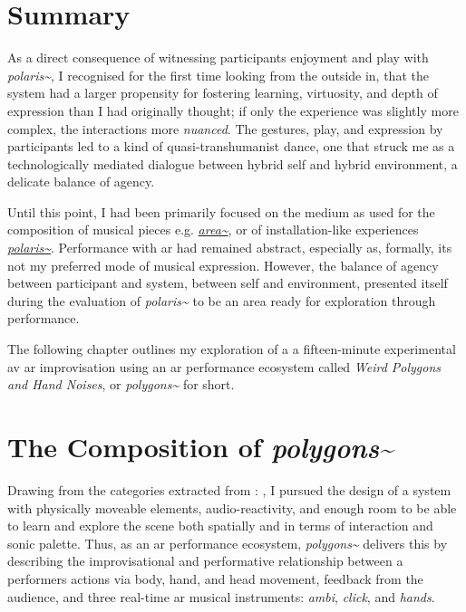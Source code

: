 \clearpage
\section{Summary}\label{sec: polygons-developing}
As a direct consequence of witnessing participants enjoyment and play with \textit{polaris\textasciitilde{}}, I recognised for the first time looking from the outside in, that the system had a larger propensity for fostering learning, virtuosity, and depth of expression than I had originally thought; if only the experience was slightly more complex, the interactions more \textit{nuanced}. The gestures, play, and expression by participants led to a kind of quasi-transhumanist dance, one that struck me as a technologically mediated dialogue between hybrid self and hybrid environment, a delicate balance of agency.



Until this point, I had been primarily focused on the medium as used for the composition of musical pieces e.g. \hyperref[sec: area]{\textit{area\textasciitilde{}}}, or of installation-like experiences \hyperref[sec: polaris]{\textit{polaris\textasciitilde{}}}. Performance with \gls{ar} had remained abstract, especially as, formally, its not my preferred mode of musical expression. However, the balance of agency between participant and system, between self and environment, presented itself during the evaluation of \textit{polaris\textasciitilde{}} to be an area ready for exploration through performance. 

The following chapter outlines my exploration of a a fifteen-minute experimental \gls{av} \gls{ar} improvisation using an \gls{ar} performance ecosystem called \textit{Weird Polygons and Hand Noises}, or \textit{polygons\textasciitilde{}} for short.



\section{The Composition of \textit{polygons\textasciitilde{}}}\label{sec: polygons-composition}

Drawing from the categories extracted from : , I pursued the design of a system with physically moveable elements, audio-reactivity, and enough room to be able to learn and explore the scene both spatially and in terms of interaction and sonic palette. Thus, as an \gls{ar} performance ecosystem, \textit{polygons\textasciitilde{}} delivers this by describing the improvisational and performative relationship between a performers actions via body, hand, and head movement, feedback from the audience, and three real-time \gls{ar} musical instruments: \textit{ambi}, \textit{click}, and \textit{hands}. 

